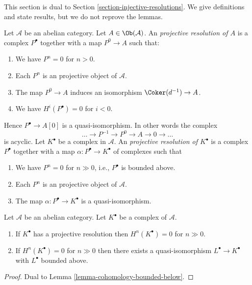 \noindent
This section is dual to
Section \ref{section-injective-resolutions}.
We give definitions and state results, but we do not reprove the lemmas.

\begin{definition}
\label{definition-projective-resolution}
Let $\mathcal{A}$ be an abelian category.
Let $A \in \Ob(\mathcal{A})$.
An {\it projective resolution of $A$} is a complex
$P^\bullet$ together with a map $P^0 \to A$ such
that:
\begin{enumerate}
\item We have $P^n = 0$ for $n > 0$.
\item Each $P^n$ is an projective object of $\mathcal{A}$.
\item The map $P^0 \to A$ induces an isomorphism $\Coker(d^{-1}) \to A$.
\item We have $H^i(P^\bullet) = 0$ for $i < 0$.
\end{enumerate}
Hence $P^\bullet \to A[0]$ is a quasi-isomorphism.
In other words the complex
$$
\ldots \to P^{-1} \to P^0 \to A \to 0 \to \ldots
$$
is acyclic. Let $K^\bullet$ be a complex in $\mathcal{A}$.
An {\it projective resolution of $K^\bullet$} is a complex
$P^\bullet$ together with a map $\alpha : P^\bullet \to K^\bullet$
of complexes such that
\begin{enumerate}
\item We have $P^n = 0$ for $n \gg 0$, i.e., $P^\bullet$ is bounded above.
\item Each $P^n$ is an projective object of $\mathcal{A}$.
\item The map $\alpha : P^\bullet \to K^\bullet$ is a
quasi-isomorphism.
\end{enumerate}
\end{definition}

\begin{lemma}
\label{lemma-cohomology-bounded-above}
Let $\mathcal{A}$ be an abelian category.
Let $K^\bullet$ be a complex of $\mathcal{A}$.
\begin{enumerate}
\item If $K^\bullet$ has a projective resolution then
$H^n(K^\bullet) = 0$ for $n \gg 0$.
\item If $H^n(K^\bullet) = 0$ for $n \gg 0$ then there
exists a quasi-isomorphism $L^\bullet \to K^\bullet$
with $L^\bullet$ bounded above.
\end{enumerate}
\end{lemma}

\begin{proof}
Dual to
Lemma \ref{lemma-cohomology-bounded-below}.
\end{proof}

